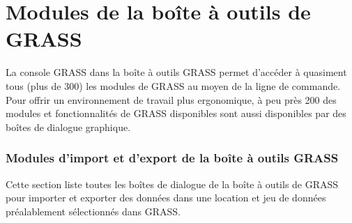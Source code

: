 \chapter{Modules de la boîte à outils de GRASS }\label{appdx_grass_toolbox_modules}

La console GRASS dans la boîte à outils GRASS permet d'accéder à quasiment tous (plus de 300) les modules de GRASS au moyen de la ligne de commande. Pour offrir un environnement de travail plus ergonomique, à peu près 200 des modules et fonctionnalités de GRASS disponibles sont aussi disponibles par des boîtes de dialogue graphique.

\subsection{Modules d'import et d'export de la boîte à outils GRASS}

Cette section liste toutes les boîtes de dialogue de la boîte à outils de GRASS pour importer et exporter des données dans une location et jeu de données préalablement sélectionnés dans GRASS.

